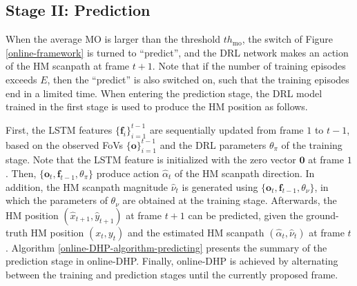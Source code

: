 \documentclass[10pt,journal,compsoc]{IEEEtran}
\begin{document}
\subsection{Stage II: Prediction}
When the average MO is larger than the threshold $th_{\text{mo}}$, the switch of Figure \ref{online-framework} is turned to ``predict'', and the DRL network makes an action of the HM scanpath at frame $t+1$.
Note that if the number of training episodes exceeds $E$, then the ``predict'' is also switched on, such that the training episodes end in a limited time.
When entering the prediction stage, the DRL model trained in the first stage is used to produce the HM position as follows.

First, the LSTM features $\{\mathbf{f}_i\}_{i=1}^{t-1}$ are sequentially updated from frame $1$ to $t-1$, based on the observed FoVs $\{\mathbf{o}\}_{i=1}^{t-1}$ and the DRL parameters $\theta_{\pi}$ of the training stage. Note that the LSTM feature is initialized with the zero vector $\mathbf{0}$ at frame $1$. Then, $\{\mathbf{o}_t, \mathbf{f}_{t-1}, \theta_{\pi}\}$ produce action $\hat{\alpha}_t$ of the HM scanpath direction. In addition, the HM scanpath magnitude $\hat{\nu}_t$ is generated using $\{\mathbf{o}_t, \mathbf{f}_{t-1}, \theta_{\nu}\}$, in which the parameters of $\theta_{\nu}$ are obtained at the training stage. Afterwards, the HM position $(\hat{x}_{t+1}, \hat{y}_{t+1})$ at frame $t+1$ can be predicted, given the ground-truth HM position $(\!x_{t}, \!y_{t}\!)$ and the estimated HM scanpath $(\hat{\alpha}_t, \hat{\nu}_t)$ at frame $t$. Algorithm \ref{online-DHP-algorithm-predicting} presents the summary of the prediction stage in online-DHP. Finally, online-DHP is achieved by alternating between the training and prediction stages until the currently proposed frame.

%
%
%
%
\end{document}
